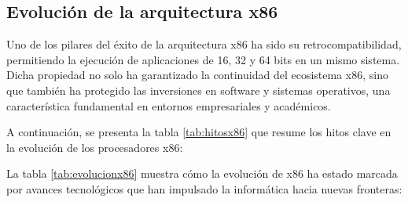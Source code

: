 \documentclass[12pt,oneside]{templates/unerthesis}
\begin{document}
\hypertarget{evoluciuxf3n-de-la-arquitectura-x86}{%
\subsection{Evolución de la arquitectura x86}\label{evoluciuxf3n-de-la-arquitectura-x86}}

Uno de los pilares del éxito de la arquitectura x86 ha sido su retrocompatibilidad, permitiendo la ejecución de aplicaciones de 16, 32 y 64 bits en un mismo sistema. Dicha propiedad no solo ha garantizado la continuidad del ecosistema x86, sino que también ha protegido las inversiones en software y sistemas operativos, una característica fundamental en entornos empresariales y académicos.

A continuación, se presenta la tabla \ref{tab:hitosx86} que resume los hitos clave en la evolución de los procesadores x86:

\begin{table}[!h]
\centering
\caption{\label{tab:hitosx86}Hitos en la evolución x86}
\centering
{}
\end{table}

La tabla \ref{tab:evolucionx86} muestra cómo la evolución de x86 ha estado marcada por avances tecnológicos que han impulsado la informática hacia nuevas fronteras:
\end{document}
